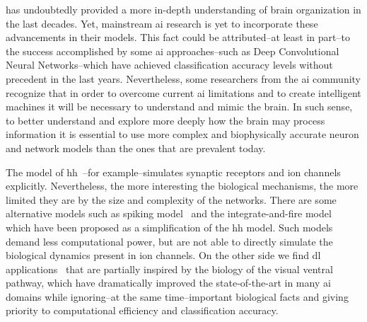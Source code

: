 \documentclass[10pt,journal,compsoc]{IEEEtran}
\begin{document}
 


 has undoubtedly provided a more in-depth understanding of brain organization in the last decades. Yet, mainstream \gls{ai} research is yet to incorporate these advancements in their models. This fact could be attributed--at least in part--to the success accomplished by some \gls{ai} approaches--such as Deep Convolutional Neural Networks--which have achieved classification accuracy levels without precedent in the last years. Nevertheless, some researchers from the \gls{ai} community recognize that in order to overcome current \gls{ai} limitations and to create intelligent machines it will be necessary to understand and mimic the brain. In such sense, to better understand and explore more deeply how the brain may process information it is essential to use more complex and biophysically accurate neuron and network models than the ones that are prevalent today.

The model of \gls{hh}~\cite{HODGKIN199025}--for example--simulates synaptic receptors and ion channels explicitly. Nevertheless, the more interesting the biological mechanisms, the more limited they are by the size and complexity of the networks. There are some alternative models such as spiking model~\cite{Izhikevich2004SpiketimingDO} and the integrate-and-fire model~\cite{1333071} which have been proposed as a simplification of the \gls{hh} model. Such models demand less computational power, but are not able to directly simulate the biological dynamics present in ion channels. On the other side we find \gls{dl} applications~\cite{lecun_deep_2015} that are partially inspired by the biology of the visual ventral pathway, which have dramatically improved the state-of-the-art in many \gls{ai} domains while ignoring--at the same time--important biological facts and giving priority to computational efficiency and classification accuracy. 
\end{document}
